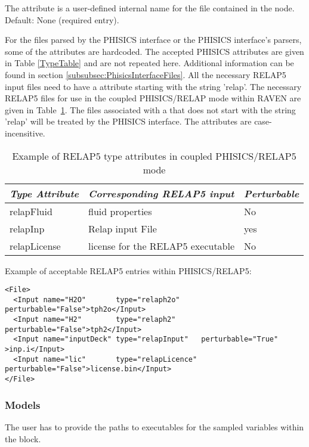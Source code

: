 The  attribute is a user-defined internal name for the file contained in the node.
Default: None (required entry).

For the files parsed by the PHISICS interface or the PHISICS interface's parsers, some of the  attributes are hardcoded.
The accepted PHISICS  attributes are given in Table \ref{TypeTable} and are not repeated here. Additional information can be found in section \ref{subsubsec:PhisicsInterfaceFiles}.
All the necessary RELAP5 input files need to have a  attribute starting with the string 'relap'.
The necessary RELAP5 files for use in the coupled PHISICS/RELAP mode within RAVEN are given in Table~\ref{PhisicsRelap5TypeTable}. The files associated
with a   that does not start with the string 'relap' will be treated by the PHISICS interface.
The   attributes are case-incensitive.
\begin{table}[]
  \centering
  \caption{Example of RELAP5 type attributes in coupled PHISICS/RELAP5 mode}\label{PhisicsRelap5TypeTable}
    \begin{tabular}{l|l|l}
\textit{Type Attribute} & \textit{Corresponding RELAP5 input} & \textit{Perturbable} \\
\hline
relapFluid              & fluid properties                  & No  \\
relapInp                & Relap input File                  & yes \\
relapLicense            & license for the RELAP5 executable & No  \\
    \end{tabular}
\end{table}

Example of acceptable RELAP5 entries within PHISICS/RELAP5:
\begin{lstlisting}[style=XML]
<File>
  <Input name="H2O"       type="relaph2o"     perturbable="False">tph2o</Input>
  <Input name="H2"        type="relaph2"      perturbable="False">tph2</Input>
  <Input name="inputDeck" type="relapInput"   perturbable="True" >inp.i</Input>
  <Input name="lic"       type="relapLicence" perturbable="False">license.bin</Input>
</File>
\end{lstlisting}
%
\subsubsection{Models}
The user has to provide the paths to executables for the sampled variables within the  block.

